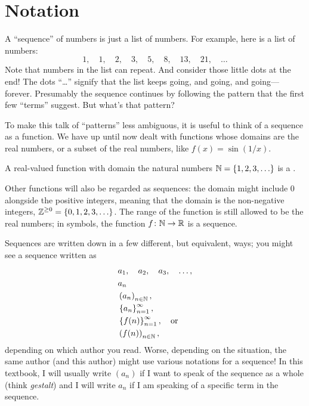 
\section{Notation}
\label{section:notation}


\nobreak A ``sequence'' of numbers is just a list of numbers.  For
example, here is a list of numbers:
$$
1,\quad 1,\quad 2,\quad 3,\quad 5,\quad 8,\quad 13,\quad 21,\quad \ldots
$$
Note that numbers in the list can repeat.  And consider those little
dots at the end!  The dots ``\ldots'' signify that the list keeps
going, and going, and going---forever.  Presumably the sequence
continues by following the pattern that the first few ``terms''
suggest.  But what's that pattern?

To make this talk of ``patterns'' less ambiguous, it is useful to
think of a sequence as a function. We have up until now dealt with
functions whose domains are the real numbers, or a subset of the real
numbers, like $f(x)=\sin (1/x)$.

A real-valued function with domain the natural numbers
$\mathbb{N}=\{1,2,3,\ldots\}$ is a .

Other functions will also be regarded as sequences: the domain might
include $0$ alongside the positive integers, meaning that the
domain is the non-negative integers, $\displaystyle
\mathbb{Z}^{\ge0}=\{0,1,2,3,\ldots\}$.  The range of the function is still
allowed to be the real numbers; in symbols, the function $f\colon
\mathbb{N}\to\mathbb{R}$ is a sequence.


Sequences are written down in a few different, but equivalent,
ways; you might see a sequence written as
\begin{align*}
  & a_1,\quad a_2, \quad a_3, \quad\ldots, \\
  & a_n \\
  & \left(a_n\right)_{n \in \mathbb{N}}, \\
  & \left\{a_n\right\}_{n=1}^\infty, \\
  & \left\{f(n)\right\}_{n=1}^\infty, \quad \mbox{or} \\
  & \left(f(n)\right)_{n \in \mathbb{N}},
\end{align*}
depending on which author you read.  Worse, depending on the
situation, the same author (and this author) might use various
notations for a sequence!  In this textbook, I will usually write
$(a_n)$ if I want to speak of the sequence as a whole (think
\textit{gestalt}) and I will write $a_n$ if I am speaking of a
specific term in the sequence.

